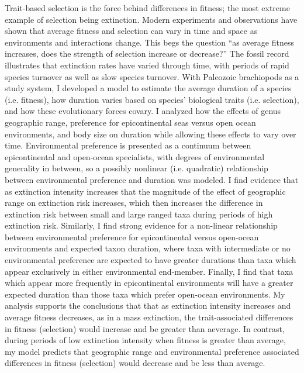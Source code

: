 \documentclass[11pt]{article}
\begin{document}
Trait-based selection is the force behind differences in fitness; the most extreme example of selection being extinction. Modern experiments and observations have shown that average fitness and selection can vary in time and space as environments and interactions change. This begs the question ``as average fitness increases, does the strength of selection increase or decrease?'' The fossil record illustrates that extinction rates have varied through time, with periods of rapid species turnover as well as slow species turnover. With Paleozoic brachiopods as a study system, I developed a model to estimate the average duration of a species (i.e. fitness), how duration varies based on species' biological traits (i.e. selection), and how these evolutionary forces covary. I analyzed how the effects of genus geographic range, preference for epicontinental seas versus open ocean environments, and body size on duration while allowing these effects to vary over time. Environmental preference is presented as a continuum between epicontinental and open-ocean specialists, with degrees of environmental generality in between, so a possibly nonlinear (i.e. quadratic) relationship between environmental preference and duration was modeled. I find evidence that as extinction intensity increases that the magnitude of the effect of geographic range on extinction risk increases, which then increases the difference in extinction risk between small and large ranged taxa during periods of high extinction risk. Similarly, I find strong evidence for a non-linear relationship between environmental preference for epicontinental versus open-ocean environments and expected taxon duration, where taxa with intermediate or no environmental preference are expected to have greater durations than taxa which appear exclusively in either environmental end-member. Finally, I find that taxa which appear more frequently in epicontinental environments will have a greater expected duration than those taxa which prefer open-ocean environments. My analysis supports the conclusions that that as extinction intensity increases and average fitness decreases, as in a mass extinction, the trait-associated differences in fitness (selection) would increase and be greater than aeverage. In contrast, during periods of low extinction intensity when fitness is greater than average, my model predicts that geographic range and environmental preference associated differences in fitness (selection) would decrease and be less than average.

\newpage{}
\end{document}
